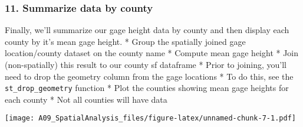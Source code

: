 \documentclass[]{article}
\newenvironment{Shaded}{\begin{snugshade}}{\end{snugshade}}
\newcommand{\KeywordTok}[1]{\textcolor[rgb]{0.13,0.29,0.53}{\textbf{#1}}}
\newcommand{\DataTypeTok}[1]{\textcolor[rgb]{0.13,0.29,0.53}{#1}}
\newcommand{\StringTok}[1]{\textcolor[rgb]{0.31,0.60,0.02}{#1}}
\newcommand{\CommentTok}[1]{\textcolor[rgb]{0.56,0.35,0.01}{\textit{#1}}}
\newcommand{\OperatorTok}[1]{\textcolor[rgb]{0.81,0.36,0.00}{\textbf{#1}}}
\newcommand{\NormalTok}[1]{#1}
\begin{document}
\subsubsection{11. Summarize data by
county}\label{summarize-data-by-county}

Finally, we'll summarize our gage height data by county and then display
each county by it's mean gage height. * Group the spatially joined gage
location/county dataset on the county name * Compute mean gage height *
Join (non-spatially) this result to our county sf dataframe * Prior to
joining, you'll need to drop the geometry column from the gage locations
* To do this, see the \texttt{st\_drop\_geometry} function * Plot the
counties showing mean gage heights for each county * Not all counties
will have data

\begin{Shaded}
\end{Shaded}

\texttt{[image: A09\_SpatialAnalysis\_files/figure-latex/unnamed-chunk-7-1.pdf]}
\end{document}
